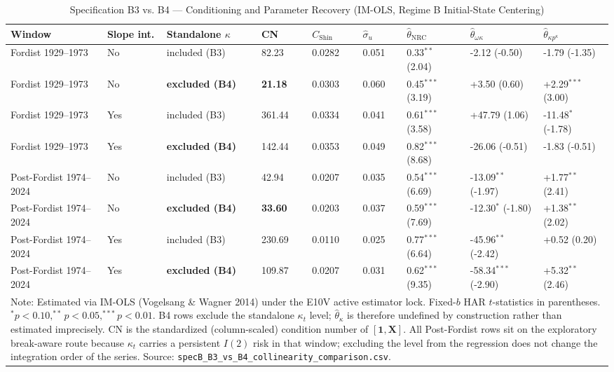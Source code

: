 \documentclass[11pt,a4paper]{article}
\begin{document}
\begin{landscape}
\begin{table}[H]
\centering
\caption{Specification B3 vs. B4 --- Conditioning and Parameter Recovery (IM-OLS, Regime B Initial-State Centering)}
\label{tab:specB_b3_vs_b4}
\small
\begin{tabular}{p{4.2cm}p{1.4cm}p{2.6cm}p{1.7cm}p{1.9cm}p{1.7cm}p{2.6cm}p{3.0cm}p{2.9cm}}
\toprule
Window & Slope int. & Standalone $\kappa$ & CN & $C_{\text{Shin}}$ & $\hat{\sigma}_u$ & $\hat{\theta}_{\text{NRC}}$ & $\hat{\theta}_{\omega \kappa}$ & $\hat{\theta}_{\kappa p^{\kappa}}$ \\
\midrule
Fordist 1929--1973 & No & included (B3) & 82.23 & 0.0282 & 0.051 & 0.33$^{**}$ (2.04) & -2.12 (-0.50) & -1.79 (-1.35) \\
Fordist 1929--1973 & No & \textbf{excluded (B4)} & \textbf{21.18} & 0.0303 & 0.060 & 0.45$^{***}$ (3.19) & +3.50 (0.60) & +2.29$^{***}$ (3.00) \\
Fordist 1929--1973 & Yes & included (B3) & 361.44 & 0.0334 & 0.041 & 0.61$^{***}$ (3.58) & +47.79 (1.06) & -11.48$^{*}$ (-1.78) \\
Fordist 1929--1973 & Yes & \textbf{excluded (B4)} & 142.44 & 0.0353 & 0.049 & 0.82$^{***}$ (8.68) & -26.06 (-0.51) & -1.83 (-0.51) \\
\midrule
Post-Fordist 1974--2024 & No & included (B3) & 42.94 & 0.0207 & 0.035 & 0.54$^{***}$ (6.69) & -13.09$^{**}$ (-1.97) & +1.77$^{**}$ (2.41) \\
Post-Fordist 1974--2024 & No & \textbf{excluded (B4)} & \textbf{33.60} & 0.0203 & 0.037 & 0.59$^{***}$ (7.69) & -12.30$^{*}$ (-1.80) & +1.38$^{**}$ (2.02) \\
Post-Fordist 1974--2024 & Yes & included (B3) & 230.69 & 0.0110 & 0.025 & 0.77$^{***}$ (6.64) & -45.96$^{**}$ (-2.42) & +0.52 (0.20) \\
Post-Fordist 1974--2024 & Yes & \textbf{excluded (B4)} & 109.87 & 0.0207 & 0.031 & 0.62$^{***}$ (9.35) & -58.34$^{***}$ (-2.90) & +5.32$^{**}$ (2.46) \\
\bottomrule
\multicolumn{9}{p{22.5cm}}{\footnotesize Note: Estimated via IM-OLS (Vogelsang \& Wagner 2014) under the E10V active estimator lock. Fixed-$b$ HAR $t$-statistics in parentheses. $^{*}p<0.10, ^{**}p<0.05, ^{***}p<0.01$. B4 rows exclude the standalone $\kappa_t$ level; $\hat{\theta}_{\kappa}$ is therefore undefined by construction rather than estimated imprecisely. CN is the standardized (column-scaled) condition number of $[\mathbf{1}, \mathbf{X}]$. All Post-Fordist rows sit on the exploratory break-aware route because $\kappa_t$ carries a persistent $I(2)$ risk in that window; excluding the level from the regression does not change the integration order of the series. Source: \texttt{specB\_B3\_vs\_B4\_collinearity\_comparison.csv}.}
\end{tabular}
\end{table}
\end{landscape}
\end{document}

